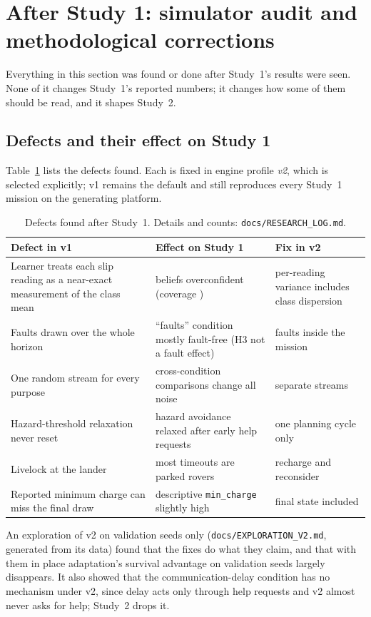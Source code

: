 \documentclass[11pt]{article}
\begin{document}
\section{After Study 1: simulator audit and methodological corrections}
\label{sec:audit}

Everything in this section was found or done after Study~1's results were
seen. None of it changes Study~1's reported numbers; it changes how some of
them should be read, and it shapes Study~2.

\subsection{Defects and their effect on Study 1}

Table~\ref{tab:defects} lists the defects found. Each is fixed in engine
profile \emph{v2}, which is selected explicitly; v1 remains the default and
still reproduces every Study~1 mission on the generating platform.

\begin{table}[h]
\centering\small
\begin{tabular}{p{}p{}p{}}
\toprule
Defect in v1 & Effect on Study 1 & Fix in v2 \\
\midrule
Learner treats each slip reading as a near-exact measurement of the class mean &
beliefs overconfident (coverage \AuditCoverageCommitted{}) & per-reading variance includes class dispersion \\
Faults drawn over the whole horizon & ``faults'' condition mostly fault-free (H3 not a fault effect) & faults inside the mission \\
One random stream for every purpose & cross-condition comparisons change all noise & separate streams \\
Hazard-threshold relaxation never reset & hazard avoidance relaxed after early help requests & one planning cycle only \\
Livelock at the lander & most timeouts are parked rovers & recharge and reconsider \\
Reported minimum charge can miss the final draw & descriptive \texttt{min\_charge} slightly high & final state included \\
\bottomrule
\end{tabular}
\caption{Defects found after Study~1. Details and counts:
\texttt{docs/RESEARCH\_LOG.md}.}
\label{tab:defects}
\end{table}

An exploration of v2 on validation seeds only (\texttt{docs/EXPLORATION\_V2.md},
generated from its data) found that the fixes do what they claim, and that with
them in place adaptation's survival advantage on validation seeds largely
disappears. It also showed that the communication-delay condition has no
mechanism under v2, since delay acts only through help requests and v2 almost
never asks for help; Study~2 drops it.
\end{document}
